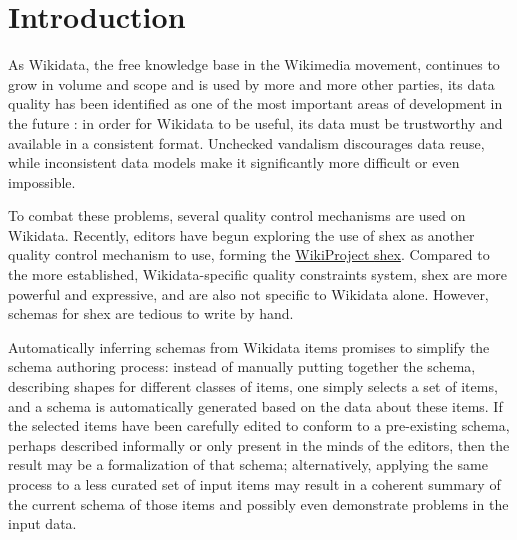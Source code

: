 
\chapter{Introduction}
\label{ch:Introduction}

As \gls{Wikidata},
the free knowledge base in the \gls{Wikimedia} movement,
continues to grow in volume and scope \cite{wikidata-fifth-birthday}
and is used by more and more other parties, %
its data quality has been identified as one of the most important areas of development in the future \cite{wdcon2017-sotp}:
in order for \gls{Wikidata} to be useful,
its data must be trustworthy and available in a consistent format.
Unchecked vandalism discourages data reuse,
while inconsistent data models make it significantly more difficult or even impossible.

To combat these problems,
several quality control mechanisms are used on \gls{Wikidata}.
Recently, editors have begun exploring the use of \acrlong{shex}
as another quality control mechanism to use,
forming the \href{https://www.wikidata.org/wiki/Wikidata:WikiProject_ShEx}{WikiProject \acrshort{shex}}.
Compared to the more established, \gls{Wikidata}-specific quality constraints system,
\acrlong{shex} are more powerful and expressive,
and are also not specific to \gls{Wikidata} alone.
However, \glspl{schema} for \acrlong{shex} are tedious to write by hand.

Automatically inferring \glspl{schema} from \gls{Wikidata} \glspl{item}
promises to simplify the \gls{schema} authoring process:
instead of manually putting together the \gls{schema},
describing shapes for different classes of \glspl{item},
one simply selects a set of \glspl{item},
and a \gls{schema} is automatically generated based on the data about these \glspl{item}.
If the selected \glspl{item} have been carefully edited
to conform to a pre-existing \gls{schema},
perhaps described informally or only present in the minds of the editors,
then the result may be a formalization of that \gls{schema};
alternatively, applying the same process to a less curated set of input \glspl{item}
may result in a coherent summary of the current \gls{schema} of those \glspl{item}
and possibly even demonstrate problems in the input data.

